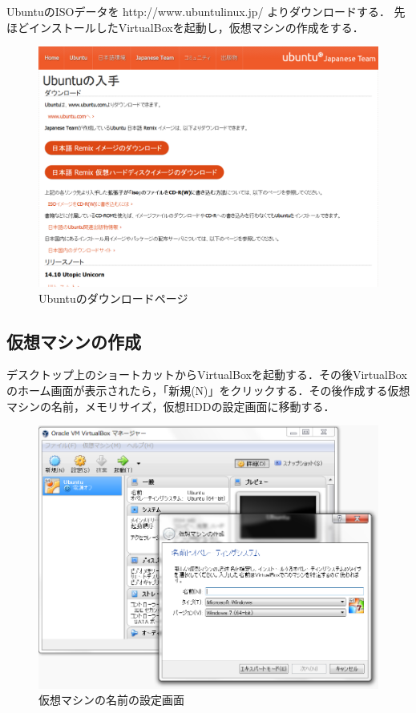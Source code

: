 UbuntuのISOデータを http://www.ubuntulinux.jp/ よりダウンロードする．
先ほどインストールしたVirtualBoxを起動し，仮想マシンの作成をする．

\begin{figure}[htb]
\centering
\includegraphics[width=15cm]{ubuntuinst.png}
\caption{Ubuntuのダウンロードページ}\label{Ubuntuのダウンロードページ}
\end{figure}

\subsection{仮想マシンの作成}

デスクトップ上のショートカットからVirtualBoxを起動する．その後VirtualBoxのホーム画面が表示されたら，「新規(N)」をクリックする．その後作成する仮想マシンの名前，メモリサイズ，仮想HDDの設定画面に移動する．

\begin{figure}[htb]
\centering
\includegraphics[width=15cm]{vb1.png}
\caption{仮想マシンの名前の設定画面}\label{仮想マシンの設定画面}
\end{figure}

